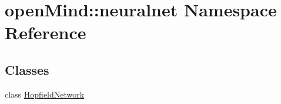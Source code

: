 \hypertarget{namespaceopen_mind_1_1neuralnet}{\section{open\+Mind\+:\+:neuralnet Namespace Reference}
\label{namespaceopen_mind_1_1neuralnet}
}
\subsection*{Classes}
\begin{DoxyCompactItemize}
\item 
class \hyperlink{classopen_mind_1_1neuralnet_1_1_hopfield_network}{Hopfield\+Network}
\end{DoxyCompactItemize}
